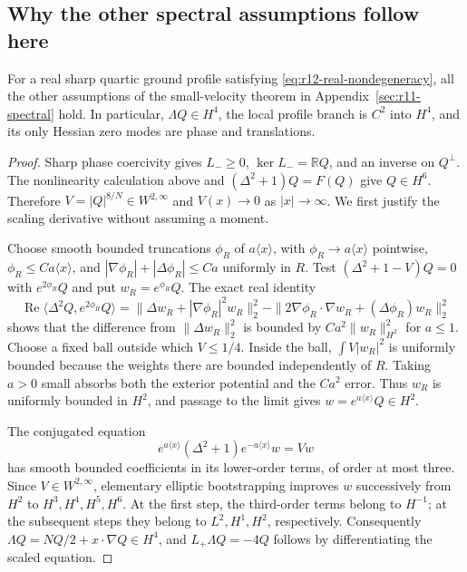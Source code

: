 \subsection{Why the other spectral assumptions follow here}

\begin{lemma}
\label{lem:r12-branch}
For a real sharp quartic ground profile satisfying
\eqref{eq:r12-real-nondegeneracy}, all the other assumptions of the
small-velocity theorem in Appendix~\ref{sec:r11-spectral} hold. In particular,
$\Lambda Q\in H^4$, the local profile branch is $C^2$ into $H^4$,
and its only Hessian zero modes are phase and translations.
\end{lemma}
\begin{proof}
Sharp phase coercivity gives $L_-\ge0$, $\ker L_-=\mathbb RQ$,
and an inverse on $Q^\perp$. The nonlinearity calculation above and
$(\Delta^2+1)Q=F(Q)$ give $Q\in H^6$. Therefore
$V=|Q|^{8/N}\in W^{2,\infty}$ and $V(x)\to0$ as $|x|\to\infty$.
We first justify the scaling derivative without assuming a moment.

Choose smooth bounded truncations $\phi_R$ of
$a\langle x\rangle$, with $\phi_R\to a\langle x\rangle$ pointwise,
$\phi_R\le Ca\langle x\rangle$, and
$|\nabla\phi_R|+|\Delta\phi_R|\le Ca$ uniformly in $R$.
Test $(\Delta^2+1-V)Q=0$ with $e^{2\phi_R}Q$ and put
$w_R=e^{\phi_R}Q$. The exact real identity
\[
 \operatorname{Re}\langle\Delta^2Q,e^{2\phi_R}Q\rangle
 =\|\Delta w_R+|\nabla\phi_R|^2w_R\|_2^2
  -\|2\nabla\phi_R\cdot\nabla w_R+(\Delta\phi_R)w_R\|_2^2
\]
shows that the difference from $\|\Delta w_R\|_2^2$ is bounded by
$Ca^2\|w_R\|_{H^2}^2$ for $a\le1$.
Choose a fixed ball outside which $V\le1/4$. Inside the ball,
$\int V|w_R|^2$ is uniformly bounded because the weights there are
bounded independently of $R$. Taking $a>0$ small absorbs both the
exterior potential and the $Ca^2$ error. Thus $w_R$ is uniformly
bounded in $H^2$, and passage to the limit gives
$w=e^{a\langle x\rangle}Q\in H^2$.

The conjugated equation
\[
 e^{a\langle x\rangle}(\Delta^2+1)e^{-a\langle x\rangle}w=Vw
\]
has smooth bounded coefficients in its lower-order terms, of order at
most three. Since $V\in W^{2,\infty}$, elementary elliptic bootstrapping
improves $w$ successively from $H^2$ to $H^3,H^4,H^5,H^6$.
At the first step, the third-order terms belong to $H^{-1}$; at the
subsequent steps they belong to $L^2,H^1,H^2$, respectively.
Consequently $\Lambda Q=NQ/2+x\cdot\nabla Q\in H^4$, and
$L_+\Lambda Q=-4Q$ follows by differentiating the scaled equation.


\end{proof}

